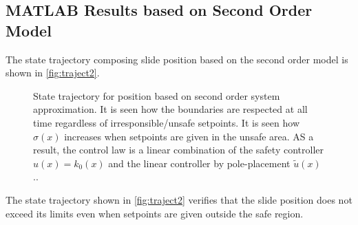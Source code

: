 \subsection{MATLAB Results based on Second Order Model}\label{subsec:matlab-resutls-2-order}
\vspace{-0.2cm}
The state trajectory composing slide position based on the second order model is shown in \autoref{fig:traject2}.
\begin{figure}[H]
%
%
\caption{State trajectory for position based on second order system approximation. It is seen how the boundaries are respected at all time regardless of irresponsible/unsafe setpoints. It is seen how $\sigma(x)$ 	increases when setpoints are given in the unsafe area. AS a result, the control law is a linear combination of the safety controller $u(x) = k_0(x)$ and the linear controller by pole-placement $\tilde{u}(x)$..}
\label{fig:traject2}
\end{figure}
%
%
%
%
The state trajectory shown in \autoref{fig:traject2} verifies that the slide position does not exceed its limits even when setpoints are given outside the safe region.

